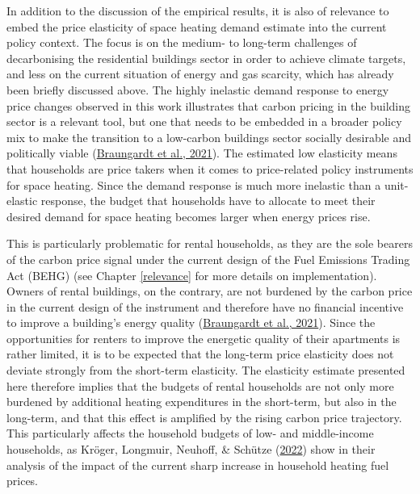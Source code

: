 \documentclass[12pt,twoside]{reedthesis}
\begin{document}
In addition to the discussion of the empirical results, it is also of relevance to embed the price elasticity of space heating demand estimate into the current policy context. The focus is on the medium- to long-term challenges of decarbonising the residential buildings sector in order to achieve climate targets, and less on the current situation of energy and gas scarcity, which has already been briefly discussed above. The highly inelastic demand response to energy price changes observed in this work illustrates that carbon pricing in the building sector is a relevant tool, but one that needs to be embedded in a broader policy mix to make the transition to a low-carbon buildings sector socially desirable and politically viable (\protect\hyperlink{ref-braungardt_etal21}{Braungardt et al., 2021}). The estimated low elasticity means that households are price takers when it comes to price-related policy instruments for space heating. Since the demand response is much more inelastic than a unit-elastic response, the budget that households have to allocate to meet their desired demand for space heating becomes larger when energy prices rise.

This is particularly problematic for rental households, as they are the sole bearers of the carbon price signal under the current design of the Fuel Emissions Trading Act (BEHG) (see Chapter \ref{relevance} for more details on implementation). Owners of rental buildings, on the contrary, are not burdened by the carbon price in the current design of the instrument and therefore have no financial incentive to improve a building's energy quality (\protect\hyperlink{ref-braungardt_etal21}{Braungardt et al., 2021}). Since the opportunities for renters to improve the energetic quality of their apartments is rather limited, it is to be expected that the long-term price elasticity does not deviate strongly from the short-term elasticity. The elasticity estimate presented here therefore implies that the budgets of rental households are not only more burdened by additional heating expenditures in the short-term, but also in the long-term, and that this effect is amplified by the rising carbon price trajectory. This particularly affects the household budgets of low- and middle-income households, as Kröger, Longmuir, Neuhoff, \& Schütze (\protect\hyperlink{ref-kroger_etal22}{2022}) show in their analysis of the impact of the current sharp increase in household heating fuel prices.
\end{document}
